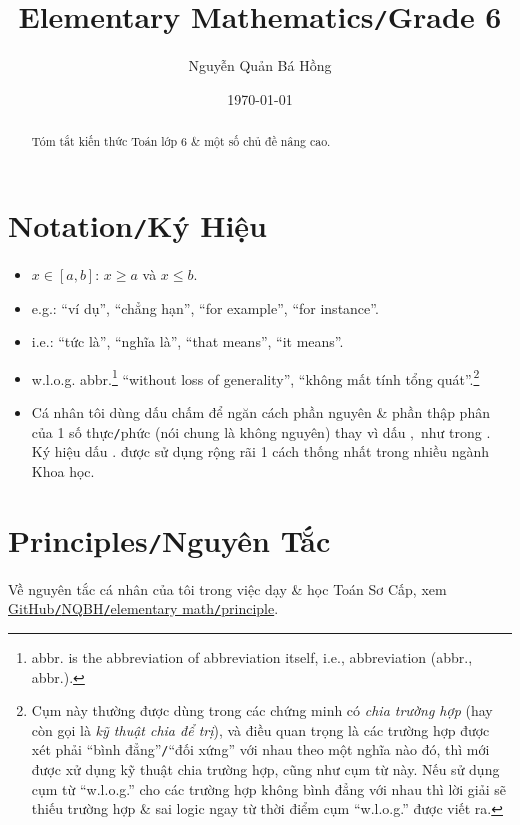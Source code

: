 \documentclass{article}
\title{Elementary Mathematics\texttt{/}Grade 6}
\author{Nguyễn Quản Bá Hồng}
\date{\today}
\numberwithin{equation}{section}
\begin{document}
\maketitle
\begin{abstract}
	Tóm tắt kiến thức Toán lớp 6 \& một số chủ đề nâng cao.
\end{abstract}
\setcounter{secnumdepth}{4}
\setcounter{tocdepth}{3}
\tableofcontents


\section*{Notation\texttt{/}Ký Hiệu}
\begin{itemize}
	\item $x\in[a,b]$: $x\ge a$ và $x\le b$.
	\item e.g.: ``ví dụ'', ``chẳng hạn'', ``for example'', ``for instance''.
	\item i.e.: ``tức là'', ``nghĩa là'', ``that means'', ``it means''.
	\item w.l.o.g. abbr.\footnote{abbr. is the abbreviation of abbreviation itself, i.e., abbreviation (abbr., abbr.).} ``without loss of generality'', ``không mất tính tổng quát''.\footnote{Cụm này thường được dùng trong các chứng minh có \textit{chia trường hợp} (hay còn gọi là \textit{kỹ thuật chia để trị}), và điều quan trọng là các trường hợp được xét phải ``bình đẳng''\texttt{/}``đối xứng'' với nhau theo một nghĩa nào đó, thì mới được xử dụng kỹ thuật chia trường hợp, cũng như cụm từ này. Nếu sử dụng cụm từ ``w.l.o.g.'' cho các trường hợp không bình đẳng với nhau thì lời giải sẽ thiếu trường hợp \& sai logic ngay từ thời điểm cụm ``w.l.o.g.'' được viết ra.}
	\item Cá nhân tôi dùng dấu chấm để ngăn cách phần nguyên \& phần thập phân của 1 số thực\texttt{/}phức (nói chung là không nguyên) thay vì dấu $,$ như trong \cite{Thai_Anh_Dat_Ha_Loan_Nam_Quang_Toan_6_tap_1, Thai_Anh_Dat_Ha_Loan_Nam_Quang_Toan_6_tap_2}. Ký hiệu dấu $.$ được sử dụng rộng rãi 1 cách thống nhất trong nhiều ngành Khoa học.
\end{itemize}


\section*{Principles\texttt{/}Nguyên Tắc}
Về nguyên tắc cá nhân của tôi trong việc dạy \& học Toán Sơ Cấp, xem \href{https://github.com/NQBH/hobby/tree/master/elementary_math/principle}{GitHub\texttt{/}NQBH\texttt{/}elementary math\texttt{/}principle}.
\end{document}

